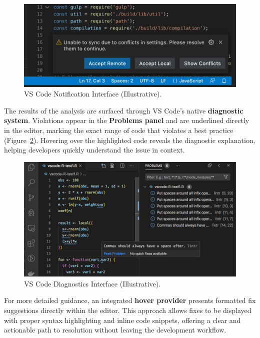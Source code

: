 \begin{spacing}{1.2}
\begin{figure}[H]
    \centering
    \includegraphics[scale=0.8]{Images/vscode_notification.png}
    \caption{VS Code Notification Interface (Illustrative).}
    \label{fig:notification_example}
\end{figure}

The results of the analysis are surfaced through VS Code’s native \textbf{diagnostic system}. Violations appear in the \textbf{Problems panel} and are underlined directly in the editor, marking the exact range of code that violates a best practice (Figure~\ref{fig:diagnostics_example}). Hovering over the highlighted code reveals the diagnostic explanation, helping developers quickly understand the issue in context.

\begin{figure}[H]
    \centering
    \includegraphics[scale=0.4]{Images/vscode_diagnostics.png}
    \caption{VS Code Diagnostics Interface (Illustrative).}
    \label{fig:diagnostics_example}
\end{figure}

For more detailed guidance, an integrated \textbf{hover provider} presents formatted fix suggestions directly within the editor. This approach allows fixes to be displayed with proper syntax highlighting and inline code snippets, offering a clear and actionable path to resolution without leaving the development workflow.


\end{spacing}
